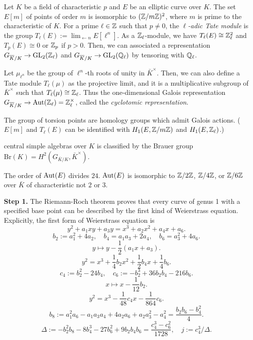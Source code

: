 \documentclass{../../large}
\begin{document}
\begin{prb}
Let $K$ be a field of characteristic $p$ and $E$ be an elliptic curve over $K$.
The set $E[m]$ of points of order $m$ is isomorphic to $(\mathbb{Z}/m\mathbb{Z})^2$, where $m$ is prime to the characteristic of $K$.
For a prime $\ell\in\mathbb{Z}$ such that $p\ne0$, the \emph{$\ell$-adic Tate module} is the group $T_\ell(E):=\lim_{\leftarrow n}E[\ell^n]$.
As a $\mathbb{Z}_\ell$-module, we have $T_\ell(E)\cong\mathbb{Z}_\ell^2$ and $T_p(E)\cong0$ or $\mathbb{Z}_p$ if $p>0$.
Then, we can associated a representation $G_{\overline K/K}\to\mathrm{GL}_2(\mathbb{Z}_\ell)$ and $G_{\overline K/K}\to\mathrm{GL}_2(\mathbb{Q}_\ell)$ by tensoring with $\mathbb{Q}_\ell$.

Let $\mu_{\ell^n}$ be the group of $\ell^n$-th roots of unity in $\bar K^\times$.
Then, we can also define a Tate module $T_\ell(\mu)$ as the projective limit, and it is a multiplicative subgroup of $\bar K^\times$ such that $T_\ell(\mu)\cong\mathbb{Z}_\ell$.
Thus the one-dimensional Galois representation $G_{\overline K/K}\to\operatorname{Aut}(\mathbb{Z}_\ell)=\mathbb{Z}_\ell^\times$, called the \emph{cyclotomic representation}.

The group of torsion points are homology groups which admit Galois actions.
($E[m]$ and $T_\ell(E)$ can be identified with $H_1(E,\mathbb{Z}/m\mathbb{Z})$ and $H_1(E,\mathbb{Z}_\ell)$.)
\end{prb}

\begin{prb}
\end{prb}
\begin{prb}
central simple algebras over $K$ is classified by the Brauer group $\mathrm{Br}(K)=H^2(G_{\bar K/K},\bar K^\times)$.
\end{prb}
\begin{prb}
The order of $\operatorname{Aut}(E)$ divides $24$.
$\operatorname{Aut}(E)$ is isomorphic to $\mathbb{Z}/2\mathbb{Z}$, $\mathbb{Z}/4\mathbb{Z}$, or $\mathbb{Z}/6\mathbb{Z}$ over $\bar K$ of characteristic not $2$ or $3$.
\end{prb}

\textbf{Step 1.}
The Riemann-Roch theorem proves that every curve of genus 1 with a specified base point can be described by the first kind of Weierstrass equation.
Explicitly, the first form of Weierstrass equation is
\[y^2+a_1xy+a_3y=x^3+a_2x^2+a_4x+a_6.\]
\[b_2:=a_1^2+4a_2,\quad b_4=a_1a_3+2a_4,\quad b_6=a_3^2+4a_6.\]
\[y\mapsto y-\frac12(a_1x+a_3).\]
\[y^2=x^3+\frac14b_2x^2+\frac12b_4x+\frac14b_6.\]
\[c_4:=b_2^2-24b_4,\quad c_6:=-b_2^3+36b_2b_4-216b_6.\]
\[x\mapsto x-\frac1{12}b_2.\]
\[y^2=x^3-\frac1{48}c_4x-\frac1{864}c_6.\]
\[b_8:=a_1^2a_6-a_1a_3a_4+4a_2a_6+a_2a_3^2-a_4^2=\frac{b_2b_6-b_4^2}4.\]
\[\Delta:=-b_2^2b_8-8b_4^3-27b_6^2+9b_2b_4b_6=\frac{c_4^3-c_6^2}{1728},\quad j:=c_4^3/\Delta.\]
\end{document}
